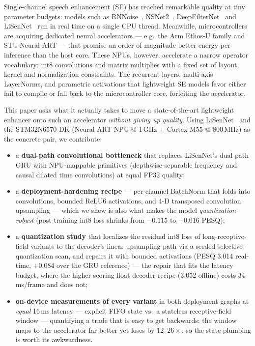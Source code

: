 \documentclass{article}
\begin{document}
Single-channel speech enhancement (SE) has reached remarkable quality at tiny
parameter budgets: models such as RNNoise~\cite{valin2018rnnoise},
NSNet2~\cite{braun2020nsnet2}, DeepFilterNet~\cite{schroter2022deepfilternet}
and LiSenNet~\cite{yan2024lisennet} run in real time on a single CPU thread.
Meanwhile, microcontrollers are acquiring dedicated neural accelerators ---
e.g.\ the Arm Ethos-U family and ST's Neural-ART --- that promise an order of
magnitude better energy per inference than the host core. These NPUs,
however, accelerate a narrow operator vocabulary: int8 convolutions and
matrix multiplies with a fixed set of layout, kernel and normalization
constraints. The recurrent layers, multi-axis LayerNorms, and parametric
activations that lightweight SE models favor either fail to compile or fall
back to the microcontroller core, forfeiting the accelerator.

This paper asks what it actually takes to move a state-of-the-art
lightweight enhancer onto such an accelerator \emph{without giving up
quality}. Using LiSenNet~\cite{yan2024lisennet} and the STM32N6570-DK
(Neural-ART NPU @ 1\,GHz + Cortex-M55 @ 800\,MHz) as the concrete pair, we
contribute:

\begin{itemize}
\item a \textbf{dual-path convolutional bottleneck} that replaces LiSenNet's
  dual-path GRU with NPU-mappable primitives (depthwise-separable
  frequency and causal dilated time convolutions) at equal FP32 quality;
\item a \textbf{deployment-hardening recipe} --- per-channel BatchNorm that
  folds into convolutions, bounded ReLU6 activations, and 4-D transposed
  convolution upsampling --- which we show is also what makes the model
  \emph{quantization-robust} (post-training int8 loss shrinks from $-0.115$
  to $-0.016$ PESQ);
\item a \textbf{quantization study} that localizes the residual int8 loss of
  long-receptive-field variants to the decoder's linear upsampling path via a
  seeded selective-quantization scan, and repairs it with bounded activations
  (PESQ 3.014 real-time, $+0.084$ over the GRU reference) --- the repair that
  fits the latency budget, where the higher-scoring float-decoder recipe
  (3.052 offline) costs 34\,ms/frame and does not;
\item \textbf{on-device measurements of every variant} in both deployment
  graphs at \emph{equal} 16\,ms latency --- explicit FIFO state vs.\ a
  stateless receptive-field window --- quantifying a trade that is easy to get
  backwards: the window maps to the accelerator far better yet loses by
  $12\text{--}26\times$, so the state plumbing is worth its awkwardness.
\end{itemize}
\end{document}
